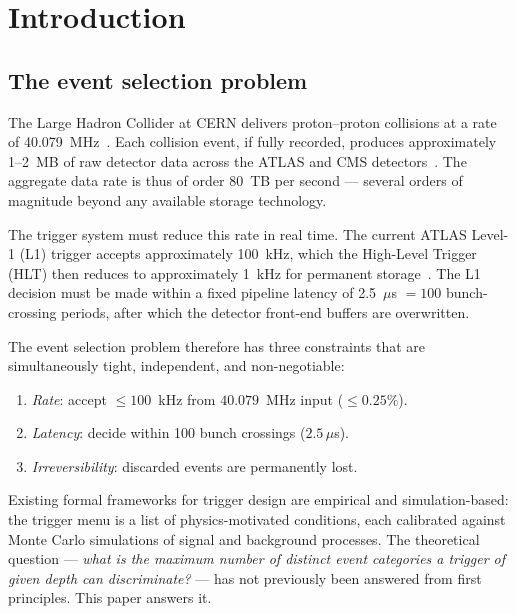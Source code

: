 \documentclass[twocolumn,10pt,a4paper]{article}
\theoremstyle{thmstyle}
\theoremstyle{definition}
\theoremstyle{remark}
\begin{document}
\tableofcontents

\section{Introduction}
\label{sec:intro}

\subsection{The event selection problem}

The Large Hadron Collider at CERN delivers proton--proton collisions at a
rate of 40.079~MHz~\citep{evans2008lhc}. Each collision event, if fully
recorded, produces approximately 1--2~MB of raw detector data across
the ATLAS and CMS detectors~\citep{atlas2008,cms2008}. The aggregate data
rate is thus of order 80~TB per second — several orders of magnitude beyond
any available storage technology.

The trigger system must reduce this rate in real time. The current ATLAS
Level-1 (L1) trigger accepts approximately 100~kHz, which the High-Level
Trigger (HLT) then reduces to approximately 1~kHz for permanent
storage~\citep{atlas_trigger_run2}. The L1 decision must be made within
a fixed pipeline latency of 2.5~$\mu$s $= 100$ bunch-crossing periods,
after which the detector front-end buffers are overwritten.

The event selection problem therefore has three constraints that are
simultaneously tight, independent, and non-negotiable:
\begin{enumerate}[nosep,label=(\roman*)]
\item \emph{Rate}: accept $\leq 100$~kHz from $40.079$~MHz input ($\leq 0.25\%$).
\item \emph{Latency}: decide within 100 bunch crossings ($2.5\,\mu$s).
\item \emph{Irreversibility}: discarded events are permanently lost.
\end{enumerate}

Existing formal frameworks for trigger design are empirical and
simulation-based: the trigger menu is a list of physics-motivated conditions,
each calibrated against Monte Carlo simulations of signal and background
processes. The theoretical question — \emph{what is the maximum number of
distinct event categories a trigger of given depth can discriminate?} — has
not previously been answered from first principles. This paper answers it.
\end{document}
